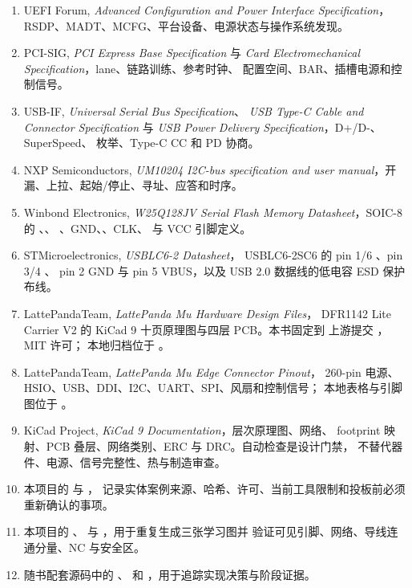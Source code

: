\begin{enumerate}
  ExitBootServices 与操作系统交接。
  \item UEFI Forum, \emph{Advanced Configuration and Power Interface
  Specification}，RSDP、MADT、MCFG、平台设备、电源状态与操作系统发现。
  \item PCI-SIG, \emph{PCI Express Base Specification} 与
  \emph{Card Electromechanical Specification}，lane、链路训练、参考时钟、
  配置空间、BAR、插槽电源和控制信号。
  \item USB-IF, \emph{Universal Serial Bus Specification}、
  \emph{USB Type-C Cable and Connector Specification} 与
  \emph{USB Power Delivery Specification}，D+/D-、SuperSpeed、
  枚举、Type-C CC 和 PD 协商。
  \item NXP Semiconductors, \emph{UM10204 I2C-bus specification and
  user manual}，开漏、上拉、起始/停止、寻址、应答和时序。
  \item Winbond Electronics, \emph{W25Q128JV Serial Flash Memory
  Datasheet}，SOIC-8 的 、、
  、GND、、CLK、
   与 VCC 引脚定义。
  \item STMicroelectronics, \emph{USBLC6-2 Datasheet}，
  USBLC6-2SC6 的 pin 1/6 、pin 3/4 、
  pin 2 GND 与 pin 5 VBUS，以及 USB 2.0 数据线的低电容 ESD 保护布线。
  \item LattePandaTeam, \emph{LattePanda Mu Hardware Design Files}，
  DFR1142 Lite Carrier V2 的 KiCad 9 十页原理图与四层 PCB。本书固定到
  上游提交 ，MIT 许可；
  本地归档位于
  。
  \item LattePandaTeam, \emph{LattePanda Mu Edge Connector Pinout}，
  260-pin 电源、HSIO、USB、DDI、I2C、UART、SPI、风扇和控制信号；
  本地表格与引脚图位于
  。
  \item KiCad Project, \emph{KiCad 9 Documentation}，层次原理图、网络、
  footprint 映射、PCB 叠层、网络类别、ERC 与 DRC。自动检查是设计门禁，
  不替代器件、电源、信号完整性、热与制造审查。
  \item 本项目的
   与
  ，
  记录实体案例来源、哈希、许可、当前工具限制和投板前必须重新确认的事项。
  \item 本项目的
  、
   与
  ，用于重复生成三张学习图并
  验证可见引脚、网络、导线连通分量、NC 与安全区。
  \item 随书配套源码中的 、
  和 ，用于追踪实现决策与阶段证据。
\end{enumerate}
